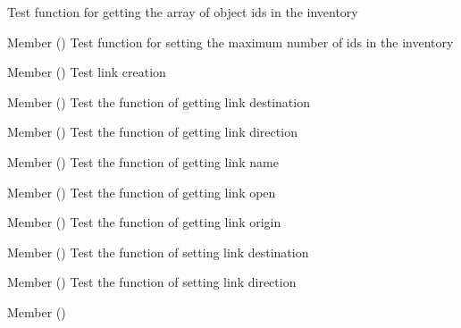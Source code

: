 \begin{DoxyRefList}
%
Test function for getting the array of object ids in the inventory  
\item[Member \doxylink{inventory__test_8h_ace30873f717c8e9e5ffe5e8017474d77}{test1\+\_\+inventory\+\_\+set\+\_\+max\+\_\+objs} ()]\label{test__test000037}%
%
Test function for setting the maximum number of ids in the inventory  
\item[Member \doxylink{link__test_8h_a82c5ee441ad22caad8272212a9e9cc26}{test1\+\_\+link\+\_\+create} ()]\label{test__test000045}%
%
Test link creation  
\item[Member \doxylink{link__test_8h_ade4160ca2a1f9ae14cff213a241da3fd}{test1\+\_\+link\+\_\+get\+\_\+destination} ()]\label{test__test000055}%
%
Test the function of getting link destination  
\item[Member \doxylink{link__test_8h_abf17aac1ac422711d09a1e2164e6a2d5}{test1\+\_\+link\+\_\+get\+\_\+direction} ()]\label{test__test000059}%
%
Test the function of getting link direction  
\item[Member \doxylink{link__test_8h_a044128db00a5cc385d7157dea8bdf3c3}{test1\+\_\+link\+\_\+get\+\_\+name} ()]\label{test__test000047}%
%
Test the function of getting link name  
\item[Member \doxylink{link__test_8h_afb384ccdc171613d24ec11d0d6050918}{test1\+\_\+link\+\_\+get\+\_\+open} ()]\label{test__test000063}%
%
Test the function of getting link open  
\item[Member \doxylink{link__test_8h_a6c513be419f92f7603bcbf116bce754d}{test1\+\_\+link\+\_\+get\+\_\+origin} ()]\label{test__test000051}%
%
Test the function of getting link origin  
\item[Member \doxylink{link__test_8h_a31d834c2fcc9c4df87c74387a7c9ac83}{test1\+\_\+link\+\_\+set\+\_\+destination} ()]\label{test__test000057}%
%
Test the function of setting link destination  
\item[Member \doxylink{link__test_8h_a8724e1f3fced5e3ac08c2368490a8ecc}{test1\+\_\+link\+\_\+set\+\_\+direction} ()]\label{test__test000061}%
%
Test the function of setting link direction  
\item[Member \doxylink{link__test_8h_ae0e478a0540bed26befc071591e3ff6c}{test1\+\_\+link\+\_\+set\+\_\+name} ()]\label{test__test000049}%

\end{DoxyRefList}
